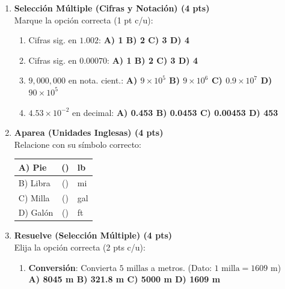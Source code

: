 \documentclass[a4paper,12pt]{article}
\begin{document}
\begin{enumerate}[label=\textbf{Item \arabic*:}, leftmargin=*]
    \item \textbf{Selección Múltiple (Cifras y Notación) (4 pts)} \\
    Marque la opción correcta (1 pt c/u):
    \begin{enumerate}[label=\roman*)]
        \item Cifras sig. en $1.002$: \textbf{A) 1 \quad B) 2 \quad C) 3 \quad D) 4}
        \item Cifras sig. en $0.00070$: \textbf{A) 1 \quad B) 2 \quad C) 3 \quad D) 4}
        \item $9,000,000$ en nota. cient.: \textbf{A) $9\times 10^5$ \quad B) $9\times 10^6$ \quad C) $0.9\times 10^7$ \quad D) $90\times 10^5$}
        \item $4.53 \times 10^{-2}$ en decimal: \textbf{A) 0.453 \quad B) 0.0453 \quad C) 0.00453 \quad D) 453}
    \end{enumerate}

    \item \textbf{Aparea (Unidades Inglesas) (4 pts)} \\
    Relacione con su símbolo correcto:
    \begin{center}
    \begin{tabular}{|l|c|l|}
        \hline
        A) Pie & (\hspace{0.5cm}) & lb \\ \hline
        B) Libra & (\hspace{0.5cm}) & mi \\ \hline
        C) Milla & (\hspace{0.5cm}) & gal \\ \hline
        D) Galón & (\hspace{0.5cm}) & ft \\ \hline
    \end{tabular}
    \end{center}

    \item \textbf{Resuelve (Selección Múltiple) (4 pts)} \\
    Elija la opción correcta (2 pts c/u):
    \begin{enumerate}[label=\Alph*)]
        \item \textbf{Conversión}: Convierta $5 \text{ millas}$ a metros. (Dato: $1 \text{ milla} = 1609 \text{ m}$) \\
        \textbf{A) 8045 m \quad B) 321.8 m \quad C) 5000 m \quad D) 1609 m}
        

\end{enumerate}
\end{enumerate}
\end{document}
